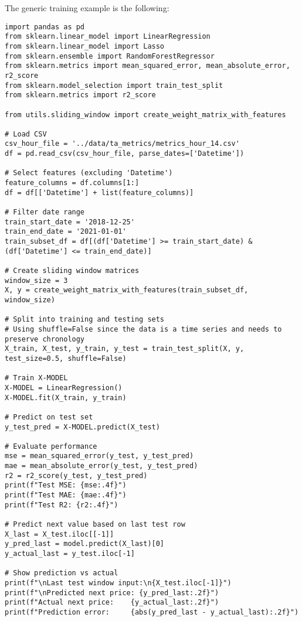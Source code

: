\documentclass[12pt]{report} %
\begin{document}
The generic training example is the following:
\begin{lstlisting}
import pandas as pd
from sklearn.linear_model import LinearRegression
from sklearn.linear_model import Lasso
from sklearn.ensemble import RandomForestRegressor
from sklearn.metrics import mean_squared_error, mean_absolute_error, r2_score
from sklearn.model_selection import train_test_split
from sklearn.metrics import r2_score

from utils.sliding_window import create_weight_matrix_with_features

# Load CSV
csv_hour_file = '../data/ta_metrics/metrics_hour_14.csv'
df = pd.read_csv(csv_hour_file, parse_dates=['Datetime'])

# Select features (excluding 'Datetime')
feature_columns = df.columns[1:]
df = df[['Datetime'] + list(feature_columns)]

# Filter date range
train_start_date = '2018-12-25'
train_end_date = '2021-01-01'
train_subset_df = df[(df['Datetime'] >= train_start_date) & (df['Datetime'] <= train_end_date)]

# Create sliding window matrices
window_size = 3
X, y = create_weight_matrix_with_features(train_subset_df, window_size)

# Split into training and testing sets
# Using shuffle=False since the data is a time series and needs to preserve chronology
X_train, X_test, y_train, y_test = train_test_split(X, y, test_size=0.5, shuffle=False)

# Train X-MODEL
X-MODEL = LinearRegression()
X-MODEL.fit(X_train, y_train)

# Predict on test set
y_test_pred = X-MODEL.predict(X_test)

# Evaluate performance
mse = mean_squared_error(y_test, y_test_pred)
mae = mean_absolute_error(y_test, y_test_pred)
r2 = r2_score(y_test, y_test_pred)
print(f"Test MSE: {mse:.4f}")
print(f"Test MAE: {mae:.4f}")
print(f"Test R2: {r2:.4f}")

# Predict next value based on last test row
X_last = X_test.iloc[[-1]]
y_pred_last = model.predict(X_last)[0]
y_actual_last = y_test.iloc[-1]

# Show prediction vs actual
print(f"\nLast test window input:\n{X_test.iloc[-1]}")
print(f"\nPredicted next price: {y_pred_last:.2f}")
print(f"Actual next price:    {y_actual_last:.2f}")
print(f"Prediction error:     {abs(y_pred_last - y_actual_last):.2f}")
\end{lstlisting}
\end{document}
